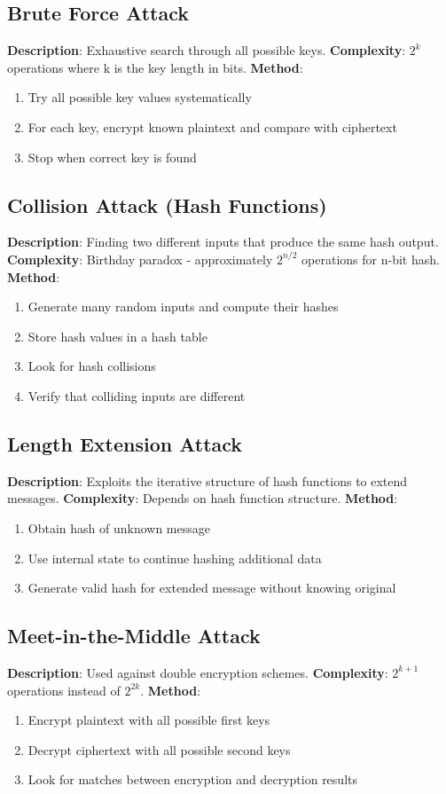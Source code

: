 \documentclass[11pt,a4paper]{article}
\begin{document}
\subsection{Brute Force Attack}
\textbf{Description}: Exhaustive search through all possible keys.
\textbf{Complexity}: $2^k$ operations where k is the key length in bits.
\textbf{Method}:
\begin{enumerate}
    \item Try all possible key values systematically
    \item For each key, encrypt known plaintext and compare with ciphertext
    \item Stop when correct key is found
\end{enumerate}

\subsection{Collision Attack (Hash Functions)}
\textbf{Description}: Finding two different inputs that produce the same hash output.
\textbf{Complexity}: Birthday paradox - approximately $2^{n/2}$ operations for n-bit hash.
\textbf{Method}:
\begin{enumerate}
    \item Generate many random inputs and compute their hashes
    \item Store hash values in a hash table
    \item Look for hash collisions
    \item Verify that colliding inputs are different
\end{enumerate}

\subsection{Length Extension Attack}
\textbf{Description}: Exploits the iterative structure of hash functions to extend messages.
\textbf{Complexity}: Depends on hash function structure.
\textbf{Method}:
\begin{enumerate}
    \item Obtain hash of unknown message
    \item Use internal state to continue hashing additional data
    \item Generate valid hash for extended message without knowing original
\end{enumerate}

\subsection{Meet-in-the-Middle Attack}
\textbf{Description}: Used against double encryption schemes.
\textbf{Complexity}: $2^{k+1}$ operations instead of $2^{2k}$.
\textbf{Method}:
\begin{enumerate}
    \item Encrypt plaintext with all possible first keys
    \item Decrypt ciphertext with all possible second keys
    \item Look for matches between encryption and decryption results
\end{enumerate}
\end{document}
